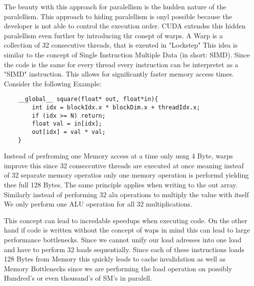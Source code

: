 The beauty with this approach for paralellism is the hudden nature of the paralellism.
This approach to hiding paralellism is onyl possible because the developer is not able to control the execution order.
CUDA extendss this hidden paralellism even further by introducing thr conept of warps.
A Warp is a collection of 32 consecutive threads, that is exeuted in "Lockstep"
This idea is similar to the concept of Single Instruction Multiple Data (in short: SIMD).
Since the code is the same for every thread every instruction can be interpretet as a "SIMD" instruction. This allows for significantly faster memory access times.
Consider the following Example:
\begin{verbatim}
    __global__ square(float* out, float*in){
        int idx = blockIdx.x * blockDim.x + threadIdx.x;
        if (idx >= N) return;
        float val = in[idx];
        out[idx] = val * val;
    }
\end{verbatim}
Instead of perfroming one Memory access at a time only usng 4 Byte, warps improve this since 32 conseccutive threads are executed at once meaning insteaf of 32 separate
memory operatios only one memory operation is performd yielding thee full 128 Bytes.
The same principle applies when writing to the out array.
Similarly instead of performing 32 alu operations to multiply the value with itself
We only perform one ALU operation for all 32 multiplications.

This concept can lead to incredable speedups when executing code. On the other hand if code is written without the concept of waps in mind this can lead to large performance bottlenecks. Since we cannot unify our load adresses into one load and have to perform 32 loads sequentially. Since each of these instructions loads 128 Bytes from Memory this quickly leads to cache invalidation as well as Memory Bottlenecks since we are performing the load operation on possibly Hundred's or even thousand's of SM's in paralell.

